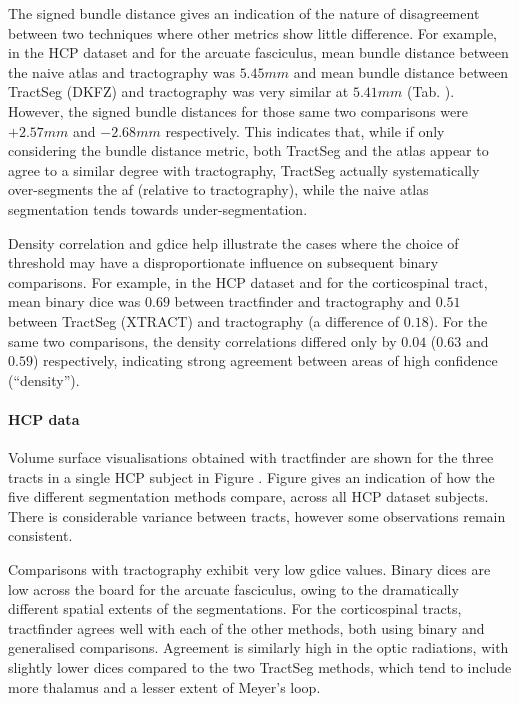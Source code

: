 The signed bundle distance gives an indication of the nature of disagreement between two techniques where other metrics show little difference.
For example, in the HCP dataset and for the arcuate fasciculus, mean bundle distance between the naive atlas and tractography was $5.45 mm$ and mean bundle distance between TractSeg (DKFZ) and tractography was very similar at $5.41 mm$ (Tab. ).
However, the signed bundle distances for those same two comparisons were $+2.57 mm$ and $-2.68 mm$ respectively.
This indicates that, while if only considering the bundle distance metric, both TractSeg and the atlas appear to agree to a similar degree with tractography, TractSeg actually systematically over-segments the \gls{af} (relative to tractography), while the naive atlas segmentation tends towards under-segmentation.

Density correlation and \gls{gdice} help illustrate the cases where the choice of threshold may have a disproportionate influence on subsequent binary comparisons.
For example, in the HCP dataset and for the corticospinal tract, mean binary \gls{dice} was $0.69$ between tractfinder and tractography and $0.51$ between TractSeg (XTRACT) and tractography (a difference of $0.18$).
For the same two comparisons, the density correlations differed only by $0.04$ ($0.63$ and $0.59$) respectively, indicating strong agreement between areas of high confidence (``density'').

\paragraph{HCP data}

Volume surface visualisations obtained with tractfinder are shown for the three tracts in a single HCP subject in Figure .
Figure  gives an indication of how the five different segmentation methods compare, across all HCP dataset subjects.
There is considerable variance between tracts, however some observations remain consistent.

Comparisons with tractography exhibit very low \gls{gdice} values.
Binary \gls{dice}s are low across the board for the arcuate fasciculus, owing to the dramatically different spatial extents of the segmentations.
For the corticospinal tracts, tractfinder agrees well with each of the other methods, both using binary and generalised comparisons.
Agreement is similarly high in the optic radiations, with slightly lower \gls{dice}s compared to the two TractSeg methods, which tend to include more thalamus and a lesser extent of Meyer's loop.


